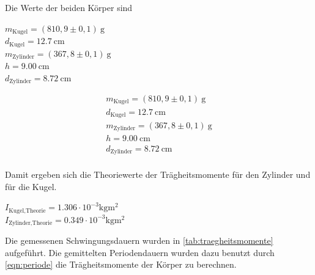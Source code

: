 



Die Werte der beiden Körper sind

\begin{center}
  $m_{\text{Kugel}} = (810,9 \pm 0,1)\:\si{\gram}$ \\
  $d_{\text{Kugel}} = \SI{12,7}{\centi\meter}$ \\
  $m_{\text{Zylinder}} = (367,8\pm 0,1)\:\si{\gram}$ \\
  $h =  \SI{9,00}{\centi\meter}$ \\
  $d_{\text{Zylinder}} =  \SI{8,72}{\centi\meter}$ \\
\end{center}

\begin{align*}
  m_{\text{Kugel}} = (810,9 \pm 0,1)\:\si{\gram} \\
  d_{\text{Kugel}} = \SI{12,7}{\centi\meter} \\
  m_{\text{Zylinder}} = (367,8\pm 0,1)\:\si{\gram} \\
  h =  \SI{9,00}{\centi\meter} \\
  d_{\text{Zylinder}} =  \SI{8,72}{\centi\meter} \\
\end{align*}

Damit ergeben sich die Theoriewerte der Trägheitsmomente für den Zylinder und für die Kugel.

\begin{center}
  $I_{\text{Kugel,Theorie}} = 1.306 \cdot 10^{-3} \si{\kilogram\meter^2}$ \\
  $I_{\text{Zylinder,Theorie}} = 0.349 \cdot 10^{-3} \si{\kilogram\meter^2}$ \\
\end{center}


Die gemessenen Schwingungsdauern wurden in \autoref{tab:traegheitsmomente} aufgeführt. Die gemittelten Periodendauern wurden dazu benutzt
durch \autoref{eqn:periode} die Trägheitsmomente der Körper zu berechnen.

